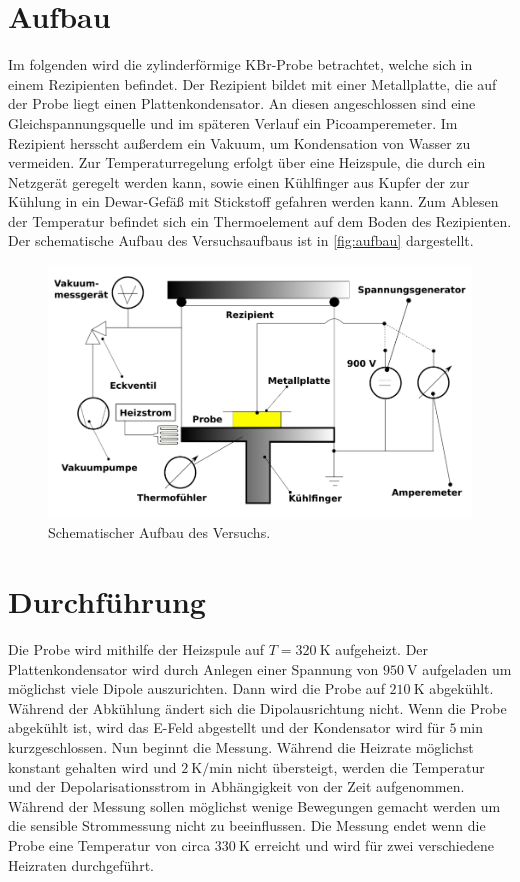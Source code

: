 \section{Aufbau}
\label{sec:Aufbau}
Im folgenden wird die zylinderförmige KBr-Probe betrachtet, welche sich in einem Rezipienten befindet.
Der Rezipient bildet mit einer Metallplatte, die auf der Probe liegt einen Plattenkondensator.
An diesen angeschlossen sind eine Gleichspannungsquelle und im späteren Verlauf ein Picoamperemeter.
Im Rezipient hersscht außerdem ein Vakuum, um Kondensation von Wasser zu vermeiden.
Zur Temperaturregelung erfolgt über eine Heizspule, die durch ein Netzgerät geregelt werden kann, sowie einen
Kühlfinger aus Kupfer der zur Kühlung in ein Dewar-Gefäß mit Stickstoff gefahren werden kann.
Zum Ablesen der Temperatur befindet sich ein Thermoelement auf dem Boden des Rezipienten.
Der schematische Aufbau des Versuchsaufbaus ist in \autoref{fig:aufbau} dargestellt.
\begin{figure}[H]
    \centering
    \includegraphics[scale=0.35]{Abbildungen/Skizze.png}
    \caption{Schematischer Aufbau des Versuchs.\cite{V48}}
    \label{fig:aufbau}
\end{figure}


\section{Durchführung}
\label{sec:Durchführung}
Die Probe wird mithilfe der Heizspule auf $T= \qty{320}{\kelvin}$ aufgeheizt. Der Plattenkondensator wird durch Anlegen einer Spannung von
$\qty{950}{\volt}$ aufgeladen um möglichst viele Dipole auszurichten. Dann wird die Probe auf $\qty{210}{\kelvin}$ abgekühlt. Während der Abkühlung
ändert sich die Dipolausrichtung nicht. Wenn die Probe abgekühlt ist, wird das E-Feld abgestellt und der Kondensator wird für $\qty{5}{\minute}$
kurzgeschlossen.
Nun beginnt die Messung.
Während die Heizrate möglichst konstant gehalten wird und $\qty{2}{\kelvin\per\minute}$ nicht übersteigt,
werden die Temperatur und der Depolarisationsstrom in Abhängigkeit von der Zeit aufgenommen.
Während der Messung sollen möglichst wenige Bewegungen gemacht werden um die sensible Strommessung nicht zu beeinflussen.
Die Messung endet wenn die Probe eine Temperatur von circa $\qty{330}{\kelvin}$ erreicht und wird für zwei verschiedene Heizraten durchgeführt.


